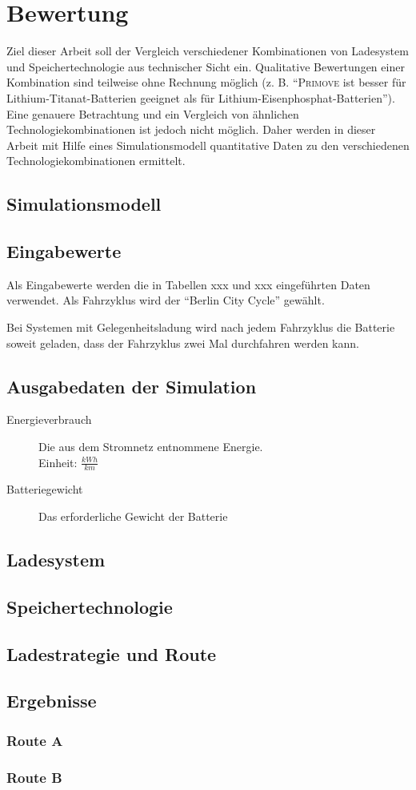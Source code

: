 \chapter{Bewertung} %
Ziel dieser Arbeit soll der Vergleich verschiedener Kombinationen von Ladesystem und Speichertechnologie aus technischer Sicht ein. Qualitative Bewertungen einer Kombination sind teilweise ohne Rechnung möglich (z. B. "`\textsc{Primove} ist besser für Lithium-Titanat-Batterien geeignet als für Lithium-Eisenphosphat-Batterien"'). Eine genauere Betrachtung und ein Vergleich von ähnlichen Technologiekombinationen ist jedoch nicht möglich. Daher werden in dieser Arbeit mit Hilfe eines Simulationsmodell quantitative Daten zu den verschiedenen Technologiekombinationen ermittelt.

\section{Simulationsmodell}

\section{Eingabewerte}
Als Eingabewerte werden die in Tabellen xxx und xxx eingeführten Daten verwendet. Als Fahrzyklus wird der "`Berlin City Cycle"' gewählt.

Bei Systemen mit Gelegenheitsladung wird nach jedem Fahrzyklus die Batterie soweit geladen, dass der Fahrzyklus zwei Mal durchfahren werden kann.

\section{Ausgabedaten der Simulation}
\begin{description}
	\item[Energieverbrauch] Die aus dem Stromnetz entnommene Energie.\\
	Einheit: $\frac{kWh}{km}$
	\item[Batteriegewicht] Das erforderliche Gewicht der Batterie 	
\end{description}

\section{Ladesystem}
\section{Speichertechnologie}
\section{Ladestrategie und Route}
\section{Ergebnisse}
\subsection{Route A}
\subsection{Route B}